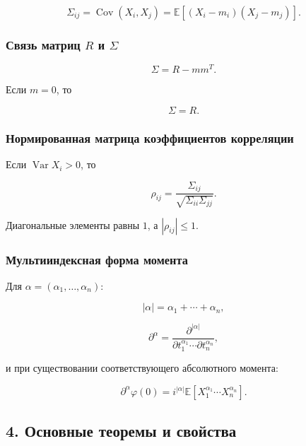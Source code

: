 \documentclass[
  11pt,
  a4paper,
]{article}
\begin{document}
\[
\Sigma_{ij}
=
\operatorname{Cov}(X_i,X_j)
=
\mathbb E[(X_i-m_i)(X_j-m_j)].
\]

\subsubsection{\texorpdfstring{Связь матриц \(R\) и
\(\Sigma\)}{Связь матриц R и \textbackslash Sigma}}\label{ux441ux432ux44fux437ux44c-ux43cux430ux442ux440ux438ux446-r-ux438-sigma}

\[
\Sigma=R-mm^T.
\]

Если \(m=0\), то

\[
\Sigma=R.
\]

\subsubsection{Нормированная матрица коэффициентов
корреляции}\label{ux43dux43eux440ux43cux438ux440ux43eux432ux430ux43dux43dux430ux44f-ux43cux430ux442ux440ux438ux446ux430-ux43aux43eux44dux444ux444ux438ux446ux438ux435ux43dux442ux43eux432-ux43aux43eux440ux440ux435ux43bux44fux446ux438ux438}

Если \(\operatorname{Var}X_i>0\), то

\[
\rho_{ij}
=
\frac{\Sigma_{ij}}
{\sqrt{\Sigma_{ii}\Sigma_{jj}}}.
\]

Диагональные элементы равны \(1\), а \(|\rho_{ij}|\le1\).

\subsubsection{Мультииндексная форма
момента}\label{ux43cux443ux43bux44cux442ux438ux438ux43dux434ux435ux43aux441ux43dux430ux44f-ux444ux43eux440ux43cux430-ux43cux43eux43cux435ux43dux442ux430}

Для \(\alpha=(\alpha_1,\ldots,\alpha_n)\):

\[
|\alpha|=\alpha_1+\cdots+\alpha_n,
\]

\[
\partial^\alpha
=
\frac{\partial^{|\alpha|}}
{\partial t_1^{\alpha_1}\cdots\partial t_n^{\alpha_n}},
\]

и при существовании соответствующего абсолютного момента:

\[
\partial^\alpha\varphi(0)
=
i^{|\alpha|}
\mathbb E\left[X_1^{\alpha_1}\cdots X_n^{\alpha_n}\right].
\]

\subsection{4. Основные теоремы и
свойства}\label{ux43eux441ux43dux43eux432ux43dux44bux435-ux442ux435ux43eux440ux435ux43cux44b-ux438-ux441ux432ux43eux439ux441ux442ux432ux430}
\end{document}
